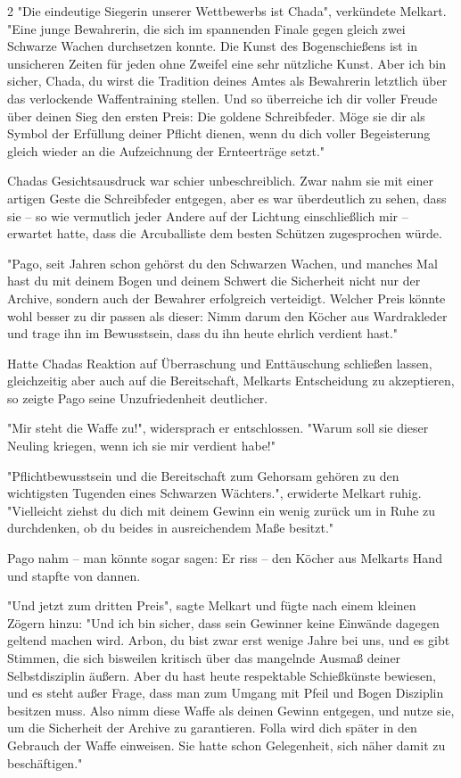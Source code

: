 \documentclass[10pt, a4paper, oneside]{book}
\begin{document}
\begin{multicols}{2}
"Die eindeutige Siegerin unserer Wettbewerbs ist Chada", verkündete Melkart. "Eine junge Bewahrerin, die sich im spannenden Finale gegen gleich zwei Schwarze Wachen durchsetzen konnte. Die Kunst des Bogenschießens ist in unsicheren Zeiten für jeden ohne Zweifel eine sehr nützliche Kunst. Aber ich bin sicher, Chada, du wirst die Tradition deines Amtes als Bewahrerin letztlich über das verlockende Waffentraining stellen. Und so überreiche ich dir voller Freude über deinen Sieg den ersten Preis: Die goldene Schreibfeder. Möge sie dir als Symbol der Erfüllung deiner Pflicht dienen, wenn du dich voller Begeisterung gleich wieder an die Aufzeichnung der Ernteerträge setzt."

Chadas Gesichtsausdruck war schier unbeschreiblich. Zwar nahm sie mit einer artigen Geste die Schreibfeder entgegen, aber es war überdeutlich zu sehen, dass sie – so wie vermutlich jeder Andere auf der Lichtung einschließlich mir – erwartet hatte, dass die Arcuballiste dem besten Schützen zugesprochen würde.

"Pago, seit Jahren schon gehörst du den Schwarzen Wachen, und manches Mal hast du mit deinem Bogen und deinem Schwert die Sicherheit nicht nur der Archive, sondern auch der Bewahrer erfolgreich verteidigt. Welcher Preis könnte wohl besser zu dir passen als dieser: Nimm darum den Köcher aus Wardrakleder und trage ihn im Bewusstsein, dass du ihn heute ehrlich verdient hast."

Hatte Chadas Reaktion auf Überraschung und Enttäuschung schließen lassen, gleichzeitig aber auch auf die Bereitschaft, Melkarts Entscheidung zu akzeptieren, so zeigte Pago seine Unzufriedenheit deutlicher.

"Mir steht die Waffe zu!", widersprach er entschlossen. "Warum soll sie dieser Neuling kriegen, wenn ich sie mir verdient habe!"

"Pflichtbewusstsein und die Bereitschaft zum Gehorsam gehören zu den wichtigsten Tugenden eines Schwarzen Wächters.", erwiderte Melkart ruhig. "Vielleicht ziehst du dich mit deinem Gewinn ein wenig zurück um in Ruhe zu durchdenken, ob du beides in ausreichendem Maße besitzt."

Pago nahm – man könnte sogar sagen: Er riss – den Köcher aus Melkarts Hand und stapfte von dannen.

"Und jetzt zum dritten Preis", sagte Melkart und fügte nach einem kleinen Zögern hinzu: "Und ich bin sicher, dass sein Gewinner keine Einwände dagegen geltend machen wird. Arbon, du bist zwar erst wenige Jahre bei uns, und es gibt Stimmen, die sich bisweilen kritisch über das mangelnde Ausmaß deiner Selbstdisziplin äußern. Aber du hast heute respektable Schießkünste bewiesen, und es steht außer Frage, dass man zum Umgang mit Pfeil und Bogen Disziplin besitzen muss. Also nimm diese Waffe als deinen Gewinn entgegen, und nutze sie, um die Sicherheit der Archive zu garantieren. Folla wird dich später in den Gebrauch der Waffe einweisen. Sie hatte schon Gelegenheit, sich näher damit zu beschäftigen."


\end{multicols}
\end{document}
